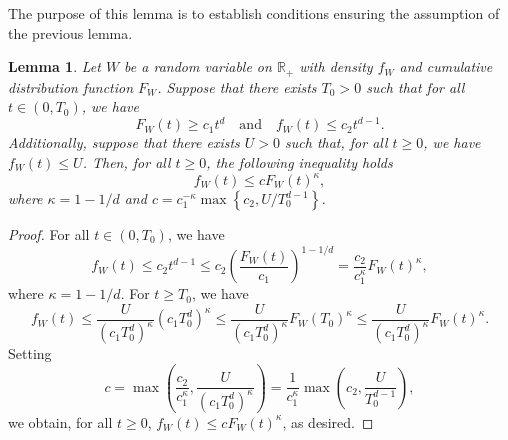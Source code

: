\documentclass[paper=a4, fontsize=11pt]{scrartcl}
\newtheorem{lemma}[theorem]{Lemma}
\begin{document}


The purpose of this lemma is to establish conditions ensuring the assumption of the previous lemma. 
\begin{lemma}\label{condition F vers kappa}  
     Let $W$ be a random variable on $\mathbb R_{+}$ with density $f_W$ and cumulative distribution function $F_W$. Suppose that there exists \( T_0 > 0 \) such that for all \( t \in (0,T_0) \), we have
\[
F_W(t) \geq c_1 t^d \quad \text{and} \quad f_W(t) \leq c_2 t^{d-1}.
\]  
Additionally, suppose that there exists $U>0$ such that, for all \( t \geq 0 \), we have \( f_W(t) \leq U \). Then,   for all \( t \geq 0 \), the following inequality holds
\[
f_W(t) \leq c F_W(t)^\kappa,
\]  
where $\kappa = 1 - 1/d$ and \( c = {c_1^{-\kappa}} \max\left\{c_2, {U} / {T_0^{d-1}}\right\} \).  
\end{lemma}  

\begin{proof}  
For all \( t \in (0, T_0) \), we have  
\[
f_W(t) \leq c_2 t^{d-1} \leq c_2 \left(\frac{F_W(t)}{c_1}\right)^{1-1/d} = \dfrac{c_2}{c_1^\kappa} F_W(t)^\kappa,
\]  
where \( \kappa = 1 - 1/d \).  For \( t \geq T_0 \), we have
\[
f_W(t) \leq \frac{U}{(c_1T_0^d)^\kappa} (c_1T_0^d)^\kappa \leq  \frac{U}{(c_1T_0^d)^\kappa} F_W(T_0)^\kappa \leq \frac{U}{(c_1T_0^d)^\kappa} F_W(t)^\kappa.
\]  
Setting  
\[
c = \max\left(\frac{c_2}{c_1^{\kappa}}, \frac{U}{(c_1T_0^d)^{\kappa}}\right) = \frac{1}{c_1^{\kappa}} \max\left(c_2, \frac{U}{T_0^{d-1}}\right),
\]  
we obtain, for all \( t \geq 0 \), 
$ f_W(t) \leq c F_W(t)^\kappa$, as desired. 
\end{proof}  
\end{document}
